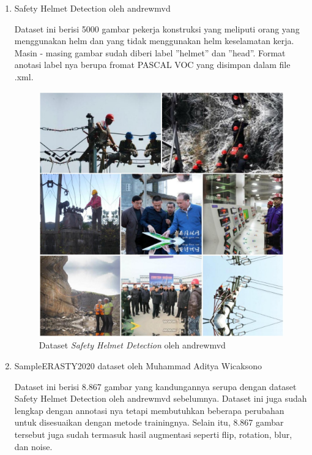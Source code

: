 \begin{enumerate}
  \item Safety Helmet Detection oleh andrewmvd
  \par Dataset ini berisi 5000 gambar pekerja konstruksi yang meliputi orang yang menggunakan helm dan yang tidak menggunakan helm keselamatan kerja. Masin - masing
  gambar sudah diberi label ”helmet” dan ”head”. Format anotasi label nya berupa
  fromat PASCAL VOC yang disimpan dalam file .xml.   

  \begin{figure}[ht]
    \centering
    \includegraphics[scale=0.2]{gambar/safetyhelemtdataset_andrewmvd.png}
    \caption{Dataset \emph{Safety Helmet Detection} oleh andrewmvd}
    \label{fig:datasethelmetdetectionpreview}  
  \end{figure}

  \item SampleERASTY2020 dataset oleh Muhammad Aditya Wicaksono
  \par Dataset ini berisi 8.867 gambar yang kandungannya serupa dengan dataset Safety Helmet Detection oleh andrewmvd sebelumnya. Dataset ini juga sudah lengkap dengan annotasi nya tetapi membutuhkan beberapa perubahan untuk disesuaikan dengan  metode trainingnya. Selain itu, 8.867 gambar tersebut juga sudah termasuk hasil augmentasi seperti flip, rotation, blur, dan noise.
\end{enumerate}

